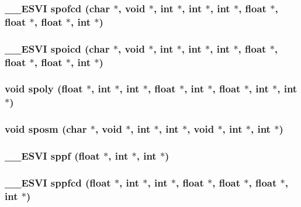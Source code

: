 \subsubsection{\setlength{\rightskip}{0pt plus 5cm}\_\-\_\-ESVI spofcd (char $\ast$, void $\ast$, int $\ast$, int $\ast$, int $\ast$, float $\ast$, float $\ast$, float $\ast$, int $\ast$)}\label{essl_8h_9ee3e5b44d2d4739d53bcd41732f559d}


\subsubsection{\setlength{\rightskip}{0pt plus 5cm}\_\-\_\-ESVI spoicd (char $\ast$, void $\ast$, int $\ast$, int $\ast$, int $\ast$, float $\ast$, float $\ast$, float $\ast$, int $\ast$)}\label{essl_8h_3d24297834cf25b53ef044e03d6d2398}


\subsubsection{\setlength{\rightskip}{0pt plus 5cm}void spoly (float $\ast$, int $\ast$, int $\ast$, float $\ast$, int $\ast$, float $\ast$, int $\ast$, int $\ast$)}\label{essl_8h_8129024350ae198d2901e248b2695b06}


\subsubsection{\setlength{\rightskip}{0pt plus 5cm}void sposm (char $\ast$, void $\ast$, int $\ast$, int $\ast$, void $\ast$, int $\ast$, int $\ast$)}\label{essl_8h_d1d640374d29004e0ca31b667cfeaab0}


\subsubsection{\setlength{\rightskip}{0pt plus 5cm}\_\-\_\-ESVI sppf (float $\ast$, int $\ast$, int $\ast$)}\label{essl_8h_73e87490c20f0daaabd94e0b19c59643}


\subsubsection{\setlength{\rightskip}{0pt plus 5cm}\_\-\_\-ESVI sppfcd (float $\ast$, int $\ast$, int $\ast$, float $\ast$, float $\ast$, float $\ast$, int $\ast$)}\label{essl_8h_b0f1e070befb4e36f2536d1c0a820f59}


